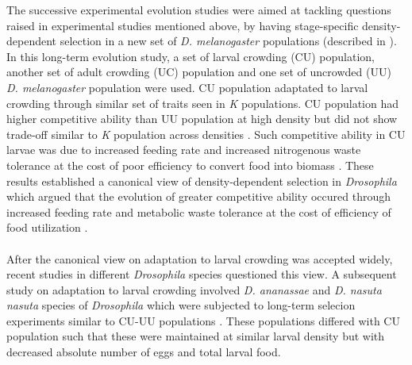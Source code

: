 The successive experimental evolution studies were aimed at tackling questions raised in experimental studies mentioned above, by having stage-specific density-dependent selection in a new set of \textit{D. melanogaster} populations (described in \cite{joshiDirectionalStabilizingDensityDependent1993}). In this long-term evolution study, a set of larval crowding (CU) population, another set of adult crowding (UC) population and one set of uncrowded (UU) \textit{D. melanogaster} population were used. CU population adaptated to larval crowding through similar set of traits seen in \textit{K} populations. CU population had higher competitive ability than UU population at high density but did not show trade-off similar to \textit{K} population across densities \citep{borashPatternsSelectionStress2001,joshiDirectionalStabilizingDensityDependent1993,santosDensityDependentNaturalSelection1997}. Such competitive ability in CU larvae was due to increased feeding rate and increased nitrogenous waste tolerance at the cost of poor efficiency to convert food into biomass \citep{borashGeneticPolymorphismMaintained1998,joshiDensitydependentNaturalSelection1996,shiotsuguSymmetryCorrelatedSelection1997}. These results established a canonical view of density-dependent selection in \textit{Drosophila} which argued that the evolution of greater competitive ability occured through increased feeding rate and metabolic waste tolerance at the cost of efficiency of food utilization \citep{joshiKselectionAselectionEffectiveness2001}. \\\\
After the canonical view on adaptation to larval crowding was accepted widely, recent studies in different \textit{Drosophila} species questioned this view. A subsequent study on adaptation to larval crowding involved \textit{D. ananassae} and \textit{D. nasuta nasuta} species of \textit{Drosophila} which were subjected to long-term selecion experiments similar to CU-UU populations \citep{nagarajanAdaptationLarvalCrowding2016}. These populations differed with CU population such that these were maintained at similar larval density but with decreased absolute number of eggs and total larval food.     
\pagebreak

